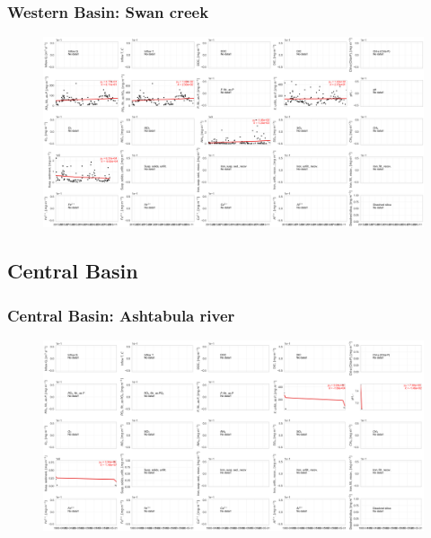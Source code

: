 \documentclass{beamer}
\begin{document}
\begin{frame}
\frametitle{Western Basin: Swan creek}

\begin{figure}
\includegraphics[width=\textwidth]{rivers/Western basin/swancreek.png}
\end{figure}

\end{frame}



\subsection{Central Basin}
\label{sub:central_basin}


\begin{frame}
\frametitle{Central Basin: Ashtabula river}

\begin{figure}
\includegraphics[width=\textwidth]{rivers/Central basin/ashtabulariver.png}
\end{figure}

\end{frame}
\end{document}

